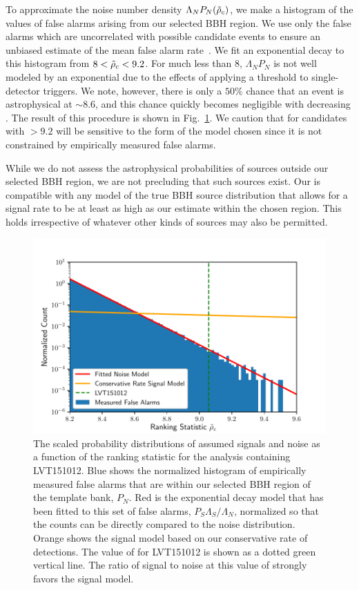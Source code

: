 To approximate the noise number density $\Lambda_N P_N(\tilde{\rho}_c)$, we make a histogram of the \rankingstat{}
values of false alarms arising from our selected BBH region. We use only the false alarms which are uncorrelated
with possible candidate events to ensure an unbiased estimate of the mean false alarm rate~\citep{2017PhRvD..96h2002C}.
We fit an exponential decay to this histogram from $8<\tilde{\rho}_c<9.2$. For \rankingstat{} much less than $8$,
$\Lambda_N P_N$ is not well modeled by an exponential due to the effects of applying a threshold to single-detector
triggers. We note, however, there is only a $ 50 \%$ chance that an event is astrophysical at
\rankingstat{} $\sim 8.6$, and this chance quickly becomes negligible with decreasing \rankingstat. The result of this
procedure is shown in Fig.~\ref{fig:pastro}. We caution that \pastro{} for candidates with
\rankingstat{} $>9.2$ will be sensitive to the form of the model chosen since it is not constrained by
empirically measured false alarms.

While we do not assess the astrophysical probabilities of sources outside our selected BBH region, we are not precluding that such sources exist.
Our \pastro{} is compatible with any model of the true BBH
source distribution that allows for a signal rate to be at least as high as our estimate within the chosen region. This holds irrespective of whatever other kinds of sources may also be permitted.

\begin{figure}[h]
  \centering
    \includegraphics[width=\columnwidth]{figs/chapter4/pastro.pdf}
\caption{The scaled probability distributions of assumed signals and noise as a function of the ranking statistic \rankingstat{} for the analysis containing LVT151012. Blue shows the normalized histogram of empirically measured false alarms that are within our selected BBH region of the template bank, $P_N$. Red is the exponential decay model that has been fitted to this set of false alarms, $P_S \Lambda_S / \Lambda_N$, normalized so that the counts can be directly compared to the noise distribution. Orange shows the signal model based on our conservative rate of detections. The value of \rankingstat{} for LVT151012 is shown as a dotted green vertical line. The ratio of signal to noise at this value of \rankingstat{} strongly favors the signal model.}
\label{fig:pastro}
\end{figure}


